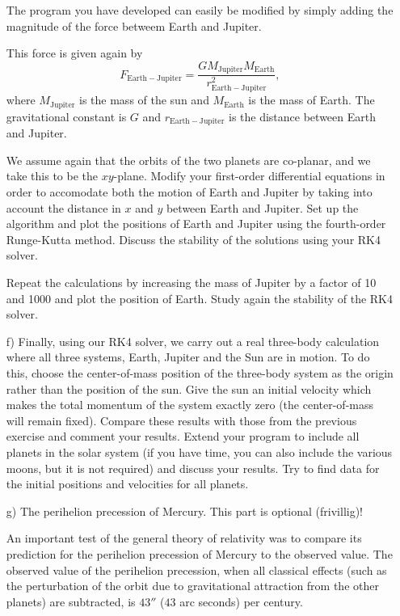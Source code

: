 \documentclass[a4wide,12pt]{article}
\begin{document}
\begin{enumerate}
The program you have developed can easily be modified by simply adding the magnitude of the force betweem Earth and Jupiter.

This force is given again by 
\[
F_{\mathrm{Earth-Jupiter}}=\frac{GM_{\mathrm{Jupiter}}M_{\mathrm{Earth}}}{r_{\mathrm{Earth-Jupiter}}^2},
\]
where $M_{\mathrm{Jupiter}}$ is the mass of the sun and $M_{\mathrm{Earth}}$ is the mass of Earth. 
The gravitational constant is $G$ and $r_{\mathrm{Earth-Jupiter}}$ is the distance between Earth and Jupiter.

We assume again that the orbits of the two planets are co-planar, and we take this to be the $xy$-plane. 
Modify your first-order differential equations in order to accomodate both the
motion of Earth and Jupiter by taking into account the distance in $x$ and
$y$ between Earth and Jupiter. Set up the algorithm and plot the positions of Earth and Jupiter using the fourth-order Runge-Kutta method.  
Discuss the stability of the solutions using your RK4 solver.

Repeat 
the calculations by increasing the mass of Jupiter by a factor of 10 and 1000
 and plot the position of Earth.  Study again the stability of the RK4 solver.

\item[f)] Finally, using our RK4 solver, we carry out a real three-body calculation where all three systems, 
Earth, Jupiter and the Sun are in motion. To do this, choose the center-of-mass position of the three-body system as 
the origin rather than the position of the sun. Give the sun an initial velocity which makes the total momentum of the system exactly zero (the center-of-mass will remain fixed). Compare these results with those from the previous exercise and comment your results. Extend your program to include all planets in the solar system (if you have time, you can also include the various moons, but it is not required) and discuss your results. Try to find data for the initial positions and velocities for all planets. 


\item[g)] The perihelion precession of Mercury. This part is optional (frivillig)!  

An important test of the general theory of relativity was to compare its prediction for the
perihelion precession of Mercury to the observed value. The observed value of the perihelion precession, when
all classical effects (such as the perturbation of the orbit due to gravitational attraction from the other planets) are
subtracted, is $43''$ ($43$ arc seconds) per century.


\end{enumerate}
\end{document}
